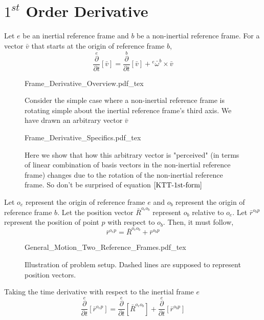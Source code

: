 \section{$1^{st}$ Order Derivative}
\begin{comment}
\end{comment}
Let $e$ be an inertial reference frame and  $b$ be a non-inertial reference frame. 
For a vector $\bar{v}$ that starts at the origin of reference frame $b$,
\begin{equation}
\overset{e}{\frac{\partial}{\partial t}}[\bar{v}] = \overset{b}{\frac{\partial}{\partial t}}[\bar{v}] + {}^{e}\bar{\omega}^{b}\times\bar{v}\label{KTT-1st-form}
\end{equation}
\begin{figure}[H]\centering
\def\svgwidth{330px}
{Frame_Derivative_Overview.pdf_tex}
\caption{Consider the simple case where a non-inertial reference frame is rotating simple about the inertial reference frame's third axis. We have drawn an arbitrary vector $\bar{v}$}
\label{Frame Derivative Overview first order}
\end{figure}
\begin{figure}[H]\centering
\def\svgwidth{500px}
{Frame_Derivative_Specifics.pdf_tex}
\caption{Here we show that how this arbitrary vector is "perceived" (in terms of linear combination of basis vectors in the non-inertial reference frame) changes due to the rotation of the non-inertial reference frame. So don't be surprised of equation $\ref{KTT-1st-form}$}
\label{Frame Derivative Specifics first order}
\end{figure}
Let $o_{e}$ represent the origin of reference frame $e$ and $o_{b}$ represent the origin of reference frame $b$. 
Let the position vector $\bar{R}^{o_{e}o_{b}}$ represent $o_{b}$ relative to $o_{e}$. 
Let $\bar{r}^{o_{b}p}$ represent the position of point $p$ with respect to $o_{b}$. 
Then, it must follow,
$$\bar{r}^{o_{e}p} = \bar{R}^{o_{e}o_{b}} + \bar{r}^{o_{b}p}$$
\begin{figure}[H]\centering
\def\svgwidth{500px}
{General_Motion_Two_Reference_Frames.pdf_tex}
\caption{Illustration of problem setup. Dashed lines are supposed to represent position vectors.}
\label{General Motion Two Reference Frames}
\end{figure}
Taking the time derivative with respect to the inertial frame $e$
$$\overset{e}{\frac{\partial}{\partial t}}[\bar{r}^{o_{e}p}] = \overset{e}{\frac{\partial}{\partial t}}[\bar{R}^{o_{e}o_{b}}] + \overset{e}{\frac{\partial}{\partial t}}[\bar{r}^{o_{b}p}]$$
